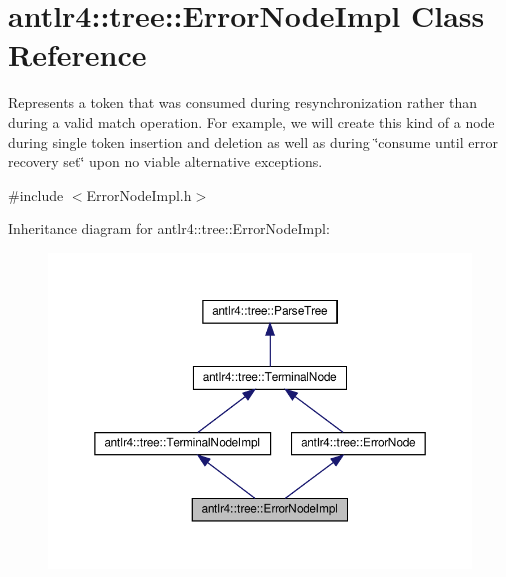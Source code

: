 \hypertarget{classantlr4_1_1tree_1_1ErrorNodeImpl}{}\section{antlr4\+:\+:tree\+:\+:Error\+Node\+Impl Class Reference}
\label{classantlr4_1_1tree_1_1ErrorNodeImpl}


Represents a token that was consumed during resynchronization rather than during a valid match operation. For example, we will create this kind of a node during single token insertion and deletion as well as during \char`\"{}consume until error recovery set\char`\"{} upon no viable alternative exceptions.  




{\ttfamily \#include $<$Error\+Node\+Impl.\+h$>$}



Inheritance diagram for antlr4\+:\+:tree\+:\+:Error\+Node\+Impl\+:
\nopagebreak
\begin{figure}[H]
\begin{center}
\leavevmode
\includegraphics[width=350pt]{classantlr4_1_1tree_1_1ErrorNodeImpl__inherit__graph}
\end{center}
\end{figure}


